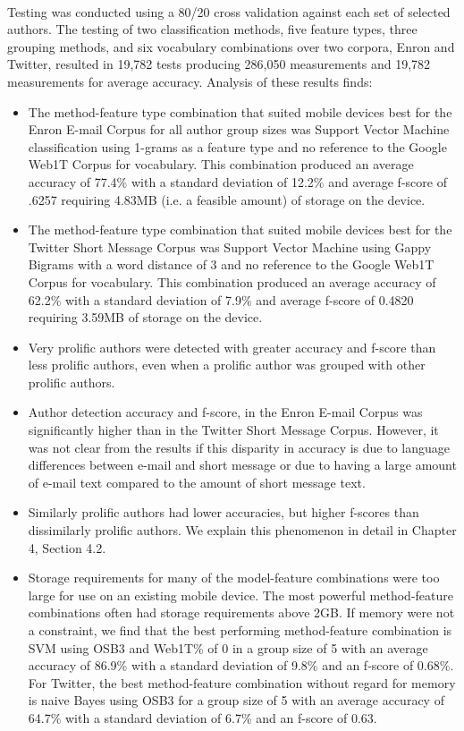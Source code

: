 	\paragraph*{} Testing was conducted using a 80/20 cross validation against each set of selected authors.  The testing of two classification methods, five feature types, three grouping methods, and six vocabulary combinations over two corpora, Enron and Twitter, resulted in 19,782 tests producing 286,050 measurements and 19,782 measurements for average accuracy.  Analysis of these results finds:
\begin{itemize} 
	\item The method-feature type combination that suited mobile devices best for the Enron E-mail Corpus for all author group sizes was Support Vector Machine classification using 1-grams as a feature type and no reference to the Google Web1T Corpus for vocabulary.  This combination produced an average accuracy of 77.4\%  with a standard deviation of 12.2\% and average f-score of .6257 requiring 4.83MB (i.e. a feasible amount) of storage on the device.
	\item The method-feature type combination that suited mobile devices best for the Twitter Short Message Corpus was Support Vector Machine using Gappy Bigrams with a word distance of 3 and no reference to the Google Web1T Corpus for vocabulary. This combination produced an average accuracy of 62.2\% with a standard deviation of 7.9\% and average f-score of 0.4820 requiring 3.59MB of storage on the device.
	\item Very prolific authors were detected with greater accuracy and f-score than less prolific authors, even when a prolific author was grouped with other prolific authors.
	\item Author detection accuracy and f-score, in the Enron E-mail Corpus was significantly higher than in the Twitter Short Message Corpus. However, it was not clear from the results if this disparity in accuracy is due to language differences between e-mail and short message or due to having a large amount of e-mail text compared to the amount of short message text.
	\item Similarly prolific authors had lower accuracies, but higher f-scores than dissimilarly prolific authors. We explain this phenomenon in detail in Chapter 4, Section 4.2.
	\item Storage requirements for many of the model-feature combinations were too large for use on an existing mobile device.  The most powerful method-feature combinations often had storage requirements above 2GB.  If memory were not a constraint, we find that the best performing method-feature combination is SVM using OSB3 and Web1T\% of 0 in a group size of 5 with an average accuracy of 86.9\% with a standard deviation of 9.8\% and an f-score of 0.68\%.  For Twitter, the best method-feature combination without regard for memory is naive Bayes using OSB3 for a group size of 5 with an average accuracy of 64.7\% with a standard deviation of 6.7\% and an f-score of 0.63.

\end{itemize}
